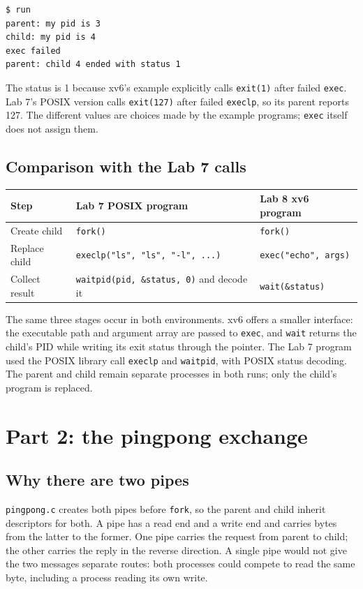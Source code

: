 \documentclass[12pt]{article}
\begin{document}
\begin{lstlisting}
$ run
parent: my pid is 3
child: my pid is 4
exec failed
parent: child 4 ended with status 1
\end{lstlisting}

The status is 1 because xv6's example explicitly calls \texttt{exit(1)}
after failed \texttt{exec}. Lab 7's POSIX version calls
\texttt{exit(127)} after failed \texttt{execlp}, so its parent reports
127. The different values are choices made by the example programs;
\texttt{exec} itself does not assign them.

\subsection{Comparison with the Lab 7 calls}
\begin{center}
\begin{tabular}{>{\raggedright\arraybackslash}p{2.2cm}
                >{\raggedright\arraybackslash}p{4.8cm}
                >{\raggedright\arraybackslash}p{5.0cm}}
\toprule
Step & Lab 7 POSIX program & Lab 8 xv6 program \\
\midrule
Create child & \texttt{fork()} & \texttt{fork()} \\
Replace child & \texttt{execlp("ls", "ls", "-l", ...)} &
  \texttt{exec("echo", args)} \\
Collect result & \texttt{waitpid(pid, \&status, 0)} and decode it &
  \texttt{wait(\&status)} \\
\bottomrule
\end{tabular}
\end{center}

The same three stages occur in both environments. xv6 offers a smaller
interface: the executable path and argument array are passed to
\texttt{exec}, and \texttt{wait} returns the child's PID while writing
its exit status through the pointer. The Lab 7 program used the POSIX
library call \texttt{execlp} and \texttt{waitpid}, with POSIX status
decoding. The parent and child remain separate processes in both runs;
only the child's program is replaced.

\section{Part 2: the pingpong exchange}
\subsection{Why there are two pipes}
\texttt{pingpong.c} creates both pipes before \texttt{fork}, so the
parent and child inherit descriptors for both. A pipe has a read end
and a write end and carries bytes from the latter to the former. One
pipe carries the request from parent to child; the other carries the
reply in the reverse direction. A single pipe would not give the two
messages separate routes: both processes could compete to read the
same byte, including a process reading its own write.
\end{document}
